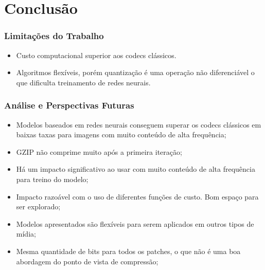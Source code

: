 \documentclass{beamer}
\begin{document}
\section{Conclusão}
\begin{frame}
\frametitle{Limitações do Trabalho}
\begin{itemize}
\item Custo computacional superior aos codecs clássicos.
\item Algoritmos flexíveis, porém quantização é uma operação não diferenciável o que dificulta treinamento de redes neurais.
\end{itemize}
\end{frame}
\begin{frame}
\frametitle{Análise e Perspectivas Futuras}
\begin{itemize}
    \item Modelos baseados em redes neurais conseguem superar os codecs clássicos em baixas taxas para imagens com muito conteúdo de alta frequência; 
    \item GZIP não comprime muito após a primeira iteração;
    \item Há um impacto significativo ao usar com muito conteúdo de alta frequência para treino do modelo;
    \item Impacto razoável com o uso de diferentes funções de custo. Bom espaço para ser explorado;
    \item Modelos apresentados são flexíveis para serem aplicados em outros tipos de mídia;
    \item Mesma quantidade de bits para todos os patches, o que não é uma boa abordagem do ponto de vista de compressão;
\end{itemize}
\end{frame}
\end{document}
